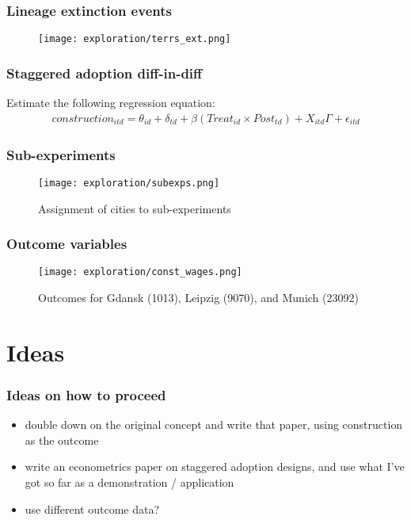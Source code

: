 \documentclass{beamer}
\begin{document}
\begin{frame}
\frametitle{Lineage extinction events}
\begin{figure}
    \centering
    \texttt{[image: exploration/terrs\_ext.png]}
    \label{fig:terrs_ext}
\end{figure}
\end{frame}

\begin{frame}
\frametitle{Staggered adoption diff-in-diff}
Estimate the following regression equation:
\begin{equation}\label{eq:did}
\begin{split}
    construction_{itd} = \theta_{id} + \delta_{td} + \beta (Treat_{id} \times Post_{td}) + X_{itd} \Gamma + \epsilon_{itd}
\end{split}
\end{equation}
\end{frame}

\begin{frame}
\frametitle{Sub-experiments}
\begin{figure}
    \centering
    \texttt{[image: exploration/subexps.png]}
    \caption{Assignment of cities to sub-experiments}
    \label{fig:subexps}
\end{figure}
\end{frame}

\begin{frame}
\frametitle{Outcome variables}
\begin{figure}
    \centering
    \texttt{[image: exploration/const\_wages.png]}
    \caption{Outcomes for Gdansk (1013), Leipzig (9070), and Munich (23092)}
    \label{fig:const_wages}
\end{figure}
\end{frame}

\section{Ideas}

\begin{frame}
\frametitle{Ideas on how to proceed}
\begin{itemize}
    \item double down on the original concept and write that paper, using construction as the outcome
    \item write an econometrics paper on staggered adoption designs, and use what I've got so far as a demonstration / application
    \item use different outcome data?
\end{itemize}
\end{frame}
\end{document}
